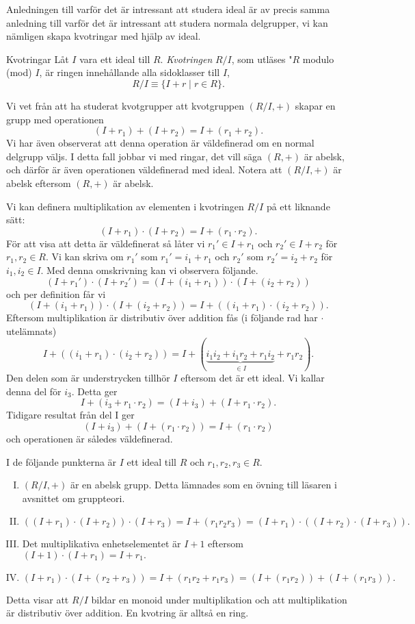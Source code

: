\documentclass{article}
\theoremstyle{definition}
\begin{document}
Anledningen till varför det är intressant att studera ideal är av precis samma anledning till varför det är intressant att studera normala delgrupper, 
vi kan nämligen skapa kvotringar med hjälp av ideal.

\begin{mydef}{Kvotringar}{}
  Låt $I$ vara ett ideal till $R$. \textit{Kvotringen} $R/I$, som utläses "$R$ modulo (mod) $I$, är ringen innehållande alla sidoklasser till $I$, 
  \[R/I \equiv \{I + r \; | \; r \in R\}.\]
\end{mydef}

Vi vet från att ha studerat kvotgrupper att kvotgruppen $(R/I, +)$ skapar en grupp med operationen 
\[ (I + r_1) + (I + r_2) = I + (r_1 + r_2).\]
Vi har även observerat att denna operation är väldefinerad om en normal delgrupp väljs. I detta fall jobbar vi med ringar, det vill säga 
$(R, +)$ är abelsk, och därför är även operationen väldefinerad med ideal. Notera att $(R/I, +)$ är abelsk eftersom $(R, +)$ är abelsk.

Vi kan definera multiplikation av elementen i kvotringen $R/I$ på ett liknande sätt:
\[(I + r_1) \cdot (I + r_2) = I + (r_1 \cdot r_2). \]
För att visa att detta är väldefinerat så låter vi $r_1' \in I + r_1$ och $r_2' \in I + r_2$ för $r_1, r_2 \in R$. Vi kan skriva 
om $r_1'$ som $r_1' = i_1 + r_1$ och $r_2'$ som $r_2' = i_2 + r_2$ för $i_1, i_2 \in I$. Med denna omskrivning kan vi observera följande.
\[(I + r_1') \cdot (I + r_2') = (I + (i_1 + r_1)) \cdot (I + (i_2 + r_2))\]
och per definition får vi 
\[(I + (i_1 + r_1)) \cdot (I + (i_2 + r_2)) = I + ((i_1 + r_1) \cdot (i_2 + r_2)).\]
Eftersom multiplikation är distributiv över addition fås (i följande rad har $\cdot$ utelämnats)
\[I + ((i_1 + r_1) \cdot (i_2 + r_2)) = I + (\underbrace{i_1  i_2 + i_1  r_2 + r_1  i_2}_{\in I} + r_1  r_2).\]
Den delen som är understrycken tillhör $I$ eftersom det är ett ideal. Vi kallar denna del för $i_3$. Detta ger
\[I + (i_3 + r_1 \cdot r_2) = (I + i_3) + (I + r_1 \cdot r_2).\]
Tidigare resultat från del I ger 
\[(I + i_3) + (I + (r_1 \cdot r_2)) = I + (r_1 \cdot r_2)\]
och operationen är således väldefinerad. 

I de följande punkterna är $I$ ett ideal till $R$ och $r_1, r_2, r_3 \in R$. 
\begin{enumerate}[I)]
  \item $(R/I, +)$ är en abelsk grupp. Detta lämnades som en övning till läsaren i avsnittet om gruppteori.
  \item $((I + r_1) \cdot (I + r_2)) \cdot (I + r_3) = I + (r_1 r_2 r_3) = (I + r_1) \cdot ((I + r_2) \cdot (I + r_3)).$
  \item Det multiplikativa enhetselementet är $I + 1$ eftersom $(I + 1) \cdot (I + r_1) = I + r_1.$
  \item $(I + r_1) \cdot (I + (r_2 + r_3)) = I + (r_1r_2 + r_1r_3) = (I + (r_1r_2)) + (I + (r_1r_3)).$
\end{enumerate}
Detta visar att $R/I$ bildar en monoid under multiplikation och att multiplikation är distributiv över addition. En kvotring är alltså en ring.
\end{document}
